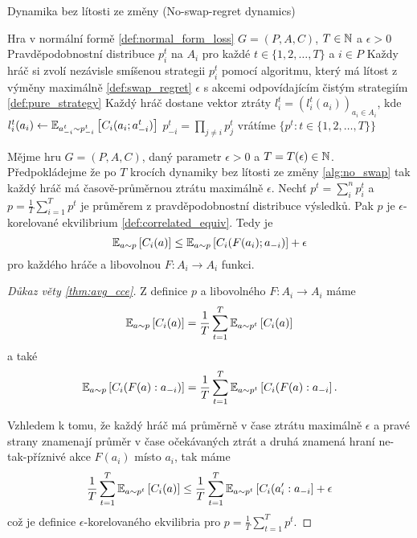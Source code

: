 \begin{algorithm}
    \algrenewcommand{}
    \algrenewcommand{}
    \caption{Dynamika bez lítosti ze změny (No-swap-regret dynamics)}
    \label{alg:no_swap}
    \begin{algorithmic}[1]
        \Require Hra v normální formě \ref{def:normal_form_loss} $G= (P,A,C)$, $T\in \N$ a $\epsilon >0$
        \Ensure Pravděpodobnostní distribuce $p^t_i$ na $A_i$ pro každé $t \in \{1,2,\dots, T\}$ a $i \in P$ 
            \State Každy hráč si zvolí nezávisle smíšenou strategii $p^t_i$ pomocí algoritmu, který má lítost z výměny maximálně \ref{def:swap_regret} $\epsilon$ s akcemi odpovídajícím čistým strategiím \ref{def:pure_strategy}
            \State Každý hráč dostane vektor ztráty $l^t_i = (l_i^t(a_i))_{a_i \in A_i}$, kde $l^t_i(a_i) \leftarrow \E[a_{-i}^t \sim p_{-i}^t]{C_i(a_i;a^t_{-i})}$
            \State $p^t_{-i} = \prod_{j \neq i} p_j^t$
        \EndFor
        \State vrátíme $\{p^t: t\in \{1,2,\dots,T\}\}$
    \end{algorithmic}
\end{algorithm}

\begin{theorem}\label{thm:avg_cce}
Mějme hru $G=(P,A,C)$, daný parametr $\epsilon > 0$ a $T = T(\epsilon) \in \N$. Předpokládejme že po $T$ krocích dynamiky bez lítosti ze změny \ref{alg:no_swap} tak každý hráč má časově-průměrnou ztrátu maximálně $\epsilon$. 
Nechť $p^t =\sum_i^n p^t_i$ a $p = \frac{1}{T} \sum^T_{i=1} p^t$ je průměrem z pravděpodobnostní distribuce výsledků. Pak $p$ je $\epsilon$-korelované ekvilibrium \ref{def:correlated_equiv}. Tedy je  
\[
    \E[a \sim p]{C_i(a)} \leq \E[a\sim p]{C_i(F(a_i);a_{-i})} + \epsilon
\]
pro každého hráče a libovolnou $F: A_i \rightarrow A_i$ funkci.
\end{theorem}
\begin{proof}[Důkaz věty \ref{thm:avg_cce}]
    Z definice $p$ a libovolného $F: A_i \rightarrow A_i$ máme 
    \[
        \E[a \sim p]{C_i(a)} = \frac{1}{T} \sum^T_{t=1} \E[a\sim p^t]{C_i(a)}
    \]
    a také
    \[
        \E[a \sim p]{C_i(F(a):a_{-i})} = \frac{1}{T} \sum^T_{t=1} \E[a\sim p^t]{C_i(F(a):a_{-i}}.
    \]

    Vzhledem k tomu, že každý hráč má průměrně v čase ztrátu maximálně $\epsilon$ a pravé strany znamenají průměr v čase očekávaných ztrát a druhá znamená hraní ne-tak-příznivé akce $F(a_i)$ místo $a_i$, tak máme
    \[
         \frac{1}{T} \sum^T_{t=1} \E[a\sim p^t]{C_i(a)} \leq \frac{1}{T} \sum^T_{t=1} \E[a\sim p^t]{C_i(a_i':a_{-i}} + \epsilon  
    \]
    což je definice $\epsilon$-korelovaného ekvilibria pro $p = \frac{1}{T} \sum^T_{t=1} p^t$. 
\end{proof}
